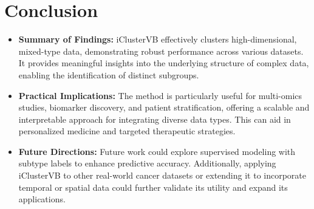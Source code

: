 \section{Conclusion}
\begin{itemize}
  \item \textbf{Summary of Findings:} iClusterVB effectively clusters high-dimensional, mixed-type data, demonstrating robust performance across various datasets. It provides meaningful insights into the underlying structure of complex data, enabling the identification of distinct subgroups.
  \item \textbf{Practical Implications:} The method is particularly useful for multi-omics studies, biomarker discovery, and patient stratification, offering a scalable and interpretable approach for integrating diverse data types. This can aid in personalized medicine and targeted therapeutic strategies.
  \item \textbf{Future Directions:} Future work could explore supervised modeling with subtype labels to enhance predictive accuracy. Additionally, applying iClusterVB to other real-world cancer datasets or extending it to incorporate temporal or spatial data could further validate its utility and expand its applications.
\end{itemize}